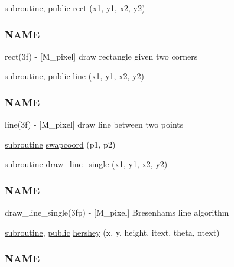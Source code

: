 \begin{DoxyCompactItemize}
\item 
\hyperlink{M__stopwatch_83_8txt_acfbcff50169d691ff02d4a123ed70482}{subroutine}, \hyperlink{M__stopwatch_83_8txt_a2f74811300c361e53b430611a7d1769f}{public} \hyperlink{namespacem__pixel_a5435aa0d9d6048a62c09d7d90665b958}{rect} (x1, y1, x2, y2)
\begin{DoxyCompactList}\small\item\em \subsubsection*{N\+A\+ME}

rect(3f) -\/ \mbox{[}M\+\_\+pixel\mbox{]} draw rectangle given two corners \end{DoxyCompactList}\item 
\hyperlink{M__stopwatch_83_8txt_acfbcff50169d691ff02d4a123ed70482}{subroutine}, \hyperlink{M__stopwatch_83_8txt_a2f74811300c361e53b430611a7d1769f}{public} \hyperlink{namespacem__pixel_a491951b89e60d0d40d67f22d987da894}{line} (x1, y1, x2, y2)
\begin{DoxyCompactList}\small\item\em \subsubsection*{N\+A\+ME}

line(3f) -\/ \mbox{[}M\+\_\+pixel\mbox{]} draw line between two points \end{DoxyCompactList}\item 
\hyperlink{M__stopwatch_83_8txt_acfbcff50169d691ff02d4a123ed70482}{subroutine} \hyperlink{namespacem__pixel_a063f74c3dd2f7f086dc47ec68abc22c9}{swapcoord} (p1, p2)
\item 
\hyperlink{M__stopwatch_83_8txt_acfbcff50169d691ff02d4a123ed70482}{subroutine} \hyperlink{namespacem__pixel_a42791c7e58158616dae7c36ec5806717}{draw\+\_\+line\+\_\+single} (x1, y1, x2, y2)
\begin{DoxyCompactList}\small\item\em \subsubsection*{N\+A\+ME}

draw\+\_\+line\+\_\+single(3fp) -\/ \mbox{[}M\+\_\+pixel\mbox{]} Bresenham\textquotesingle{}s line algorithm \end{DoxyCompactList}\item 
\hyperlink{M__stopwatch_83_8txt_acfbcff50169d691ff02d4a123ed70482}{subroutine}, \hyperlink{M__stopwatch_83_8txt_a2f74811300c361e53b430611a7d1769f}{public} \hyperlink{namespacem__pixel_a80dc3cb149287470a9837de8dd3f05bc}{hershey} (x, y, height, itext, theta, ntext)
\begin{DoxyCompactList}\small\item\em \subsubsection*{N\+A\+ME}


\end{DoxyCompactList}
\end{DoxyCompactItemize}
